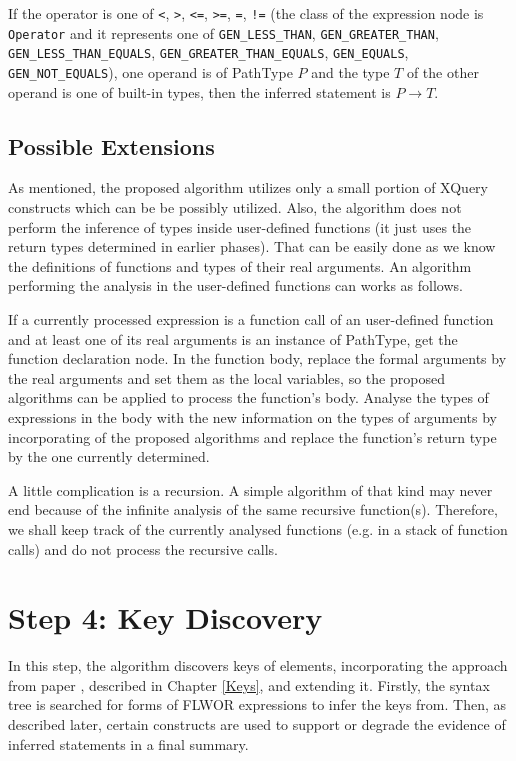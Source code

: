 If the operator is one of \texttt{<}, \texttt{>}, \texttt{<=}, \texttt{>=}, \texttt{=}, \texttt{!=} (the class of the expression node is \texttt{Operator} and it represents one of \texttt{GEN\_LESS\_THAN}, \texttt{GEN\_GREATER\_THAN}, \texttt{GEN\_LESS\_THAN\_EQUALS}, \texttt{GEN\_GREATER\_THAN\_EQUALS}, \texttt{GEN\_EQUALS}, \\ \texttt{GEN\_NOT\_EQUALS}), one operand is of PathType $P$ and the type $T$ of the other operand is one of built-in types, then the inferred statement is $P \rightarrow T$.

\subsection{Possible Extensions}
As mentioned, the proposed algorithm utilizes only a small portion of XQuery constructs which can be be possibly utilized. Also, the algorithm does not perform the inference of types inside user-defined functions (it just uses the return types determined in earlier phases). That can be easily done as we know the definitions of functions and types of their real arguments. An algorithm performing the analysis in the user-defined functions can works as follows.

If a currently processed expression is a function call of an user-defined function and at least one of its real arguments is an instance of PathType, get the function declaration node. In the function body, replace the formal arguments by the real arguments and set them as the local variables, so the proposed algorithms can be applied to process the function's body. Analyse the types of expressions in the body with the new information on the types of arguments by incorporating of the proposed algorithms and replace the function's return type by the one currently determined.

A little complication is a recursion. A simple algorithm of that kind may never end because of the infinite analysis of the same recursive function(s). Therefore, we shall keep track of the currently analysed functions (e.g. in a stack of function calls) and do not process the recursive calls. 


\section{Step 4: Key Discovery}
In this step, the algorithm discovers keys of elements, incorporating the approach from paper \cite{Necasky:2009:DXK:1529282.1529414}, described in Chapter \ref{Keys}, and extending it. Firstly, the syntax tree is searched for forms of FLWOR expressions to infer the keys from. Then, as described later, certain constructs are used to support or degrade the evidence of inferred statements in a final summary.

